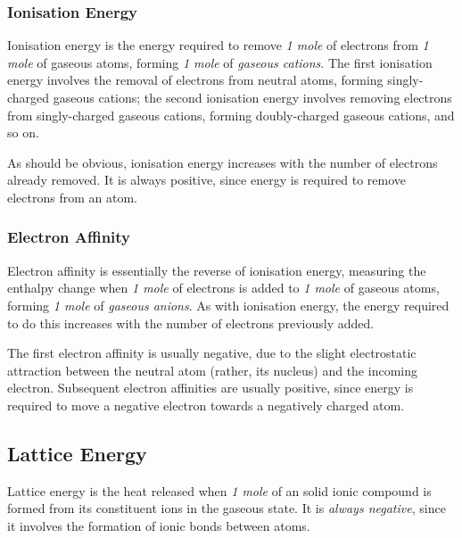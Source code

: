
		\subsubsection{Ionisation Energy}

			Ionisation energy is the energy required to remove \emph{1 mole} of electrons from \emph{1 mole} of gaseous atoms, forming
			\emph{1 mole} of \emph{gaseous cations}. The first ionisation energy involves the removal of electrons from neutral atoms,
			forming singly-charged gaseous cations; the second ionisation energy involves removing electrons from singly-charged gaseous
			cations, forming doubly-charged gaseous cations, and so on.

			As should be obvious, ionisation energy increases with the number of electrons already removed. It is always positive,
			since energy is required to remove electrons from an atom.


		\subsubsection{Electron Affinity}

			Electron affinity is essentially the reverse of ionisation energy, measuring the enthalpy change when \emph{1 mole} of electrons
			is added to \emph{1 mole} of gaseous atoms, forming \emph{1 mole} of \emph{gaseous anions}. As with ionisation energy, the energy
			required to do this increases with the number of electrons previously added.

			The first electron affinity is usually negative, due to the slight electrostatic attraction between the neutral atom (rather, its
			nucleus) and the incoming electron. Subsequent electron affinities are usually positive, since energy is required to move a negative
			electron towards a negatively charged atom.



	\subsection{Lattice Energy}

		Lattice energy is the heat released when \emph{1 mole} of an solid ionic compound is formed from its constituent ions in the
		gaseous state. It is \emph{always negative}, since it involves the formation of ionic bonds between atoms.

